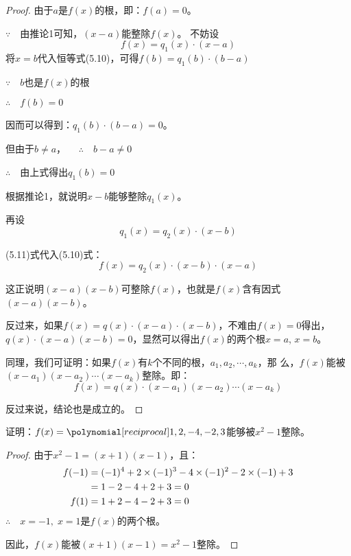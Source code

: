 \begin{proof}
    由于$a$是$f(x)$的根，即：$f(a)=0$。
   
    $\because\quad $由推论1可知，$(x-a)$能整除$f(x)$。
    不妨设
    \begin{equation}
        f(x)=q_1(x)\cdot (x-a)
    \end{equation}
    将$x=b$代入恒等式(5.10)，可得$f (b) =q_1 (b)\cdot (b-a)$

    $\because\quad b$也是$f(x)$的根
    
    $\therefore\quad f(b)=0$
    
    因而可以得到：$q_1(b)\cdot (b-a)=0$。
    
    但由于$b\ne a$，
    $\quad\therefore\quad b-a\ne 0$

    $\therefore\quad$由上式得出$q_1(b)=0$

    根据推论1，就说明$x-b$能够整除$q_1(x)$。
    
    再设
\begin{equation}
    q_1 (x) =q_2 (x) \cdot  (x-b)
\end{equation}
    
(5.11)式代入(5.10)式：
\[f (x) =q_2 (x) \cdot (x-b)\cdot (x-a)\]

这正说明$(x-a)(x-b)$可整除$f(x)$，也就是$f(x)$含有因式$(x-a)(x-b)$。

反过来，如果$f(x)=q(x)\cdot (x-a)·(x-b)$，不难由$f(x)=0$得出，$q(x)\cdot (x-a)(x-b)=0$，显然可以得出$f(x)$的两个根$x=a$, $x=b$。
    
    同理，我们可证明：如果$f(x)$有$k$个不同的根，$a_1,a_2,\cdots,a_k$，那
    么，$f(x)$能被$(x-a_1)(x-a_2)\cdots(x-a_k)$整除。即：
    \[f (x) =q (x) \cdot  (x-a_1) (x-a_2)\cdots (x-a_k)\] 
    
    反过来说，结论也是成立的。

\end{proof}

\begin{example}
证明：$f(x)=\poly{1,2,-4,-2,3}$能够被$x^2-1$整除。
\end{example}

\begin{proof}
由于$x^2-1=(x+1)(x-1)$，且：
\[\begin{split}
    f(-1)&=(-1)^4+2\times(-1)^3-4\times(-1)^2-2\times (-1)+3\\
&=1-2-4+2+3=0\\
f(1)&=1+2-4-2+3=0
\end{split}\]
$\therefore\quad x=-1,\; x=1$是$f(x)$的两个根。

因此，$f(x)$能被$(x+1)(x-1)=x^2-1$整除。

\end{proof}

